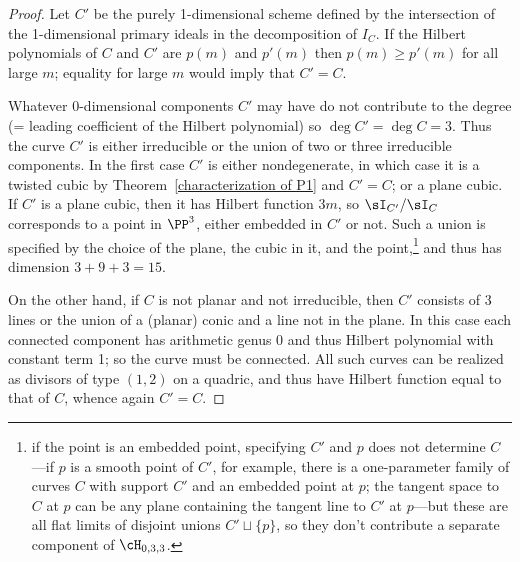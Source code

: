 \begin{proof}
Let $C'$ be the purely 1-dimensional scheme defined by the intersection of the 1-dimensional primary ideals in the decomposition of $I_C$. If the Hilbert polynomials of $C$ and $C'$ are $p(m)$ and  $p'(m)$ then
$p(m) \geq p'(m)$ for all large $m$; equality for large $m$ would imply that $C'=C$.

Whatever 0-dimensional components $C'$ may have do not contribute to the degree (= leading coefficient of the Hilbert polynomial) so $\deg C' = \deg C = 3$. Thus the curve $C'$ is either irreducible or the union of two or three irreducible components. In the first case $C'$ is either nondegenerate, in which case it is a twisted cubic by Theorem~\ref{characterization of P1} and $C' = C$; or a plane cubic. If $C'$ is a plane cubic, then it has Hilbert function $3m$, so $\sI_{C'}/\sI_C$
corresponds to a point in $\PP^3$, either embedded in $C'$ or not. Such a union is specified by the choice of the
plane, the cubic in it, and the point,\footnote{if the point is an embedded point, specifying $C'$ and $p$ does not determine $C$---if $p$ is a smooth point of $C'$, for example, there is a one-parameter family of curves $C$ with support $C'$ and an embedded point at $p$; the tangent space to $C$ at $p$ can be any plane containing the tangent line to $C'$ at $p$---but these are all flat limits of disjoint unions $C' \sqcup \{p\}$, so they don't contribute a separate component of $\cH_{0,3,3}$.} and thus has dimension $3+9+3 = 15.$

On the other hand, if $C$ is not planar and not irreducible, then $C'$ consists of 3 lines or the union of a (planar) conic
and a line not in the plane. In this case each connected component has arithmetic genus 0 and thus Hilbert polynomial
with constant term 1; so the curve must be connected. All such curves can be realized as divisors of type $(1,2)$
on a quadric, and thus have Hilbert function equal to that of $C$, whence again $C' = C$.
\end{proof}


